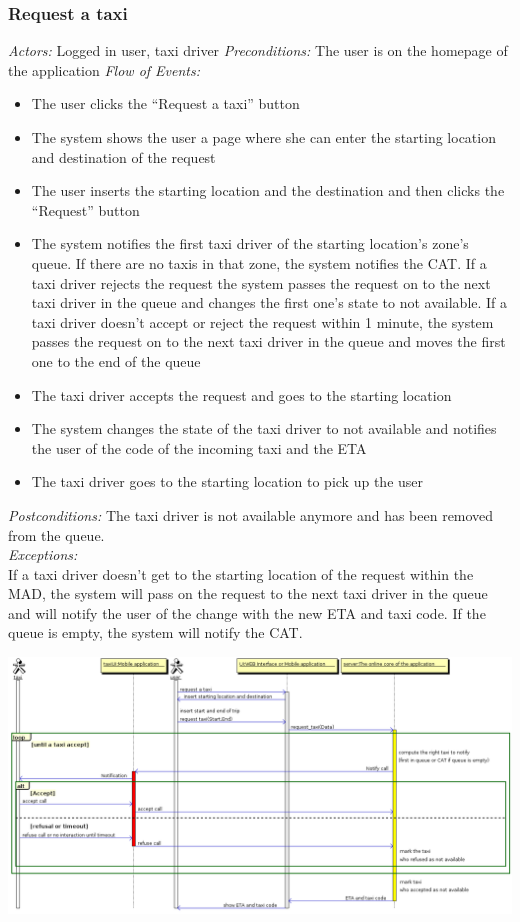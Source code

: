 \documentclass{article}
\begin{document}
\subsubsection{Request a taxi}
\textit{Actors:} Logged in user, taxi driver
\textit{Preconditions:} The user is on the homepage of the application
\textit{Flow of Events:}
\begin{itemize}
	\item  The user clicks the ``Request a taxi'' button
	\item  The system shows the user a page where she can enter the starting location and destination of the request
	\item  The user inserts the starting location and the destination and then clicks the ``Request'' button
	\item  The system notifies the first taxi driver of the starting location's zone's queue. If there are no taxis in that zone, the system notifies the CAT\@. If a taxi driver rejects the request the system passes the request on to the next taxi driver in the queue and changes the first one's state to not available. If a taxi driver doesn't accept or reject the request within 1 minute, the system passes the request on to the next taxi driver in the queue and moves the first one to the end of the queue
	\item  The taxi driver accepts the request and goes to the starting location
	\item  The system changes the state of the taxi driver to not available and notifies the user of the code of the incoming taxi and the ETA 
	\item The taxi driver goes to the starting location to pick up the user
\end{itemize}
\textit{Postconditions:} The taxi driver is not available anymore and has been removed from the queue.
\\\textit{Exceptions:}
\\If a taxi driver doesn't get to the starting location of the request within the MAD, the system will pass on the request to the next taxi driver in the queue and will notify the user of the change with the new ETA and taxi code. If the queue is empty, the system will notify the CAT.\@\\

\begin{center}	
	\includegraphics[width=\textwidth,keepaspectratio]{Sequence-Diagrams/request-a-taxi}
\end{center}
\end{document}
